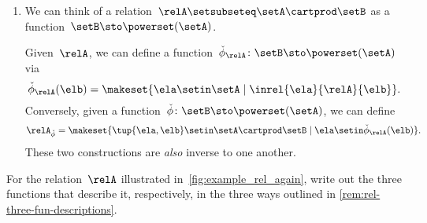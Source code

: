 \begin{enumerate}
    \item We can think of a relation~$\relA \setsubseteq \setA \cartprod \setB$ as a function~$\setB  \sto \powerset (\setA)$.

          Given~$\relA$, we can define a function~$\check \phi_{\relA} \colon \setB \sto \powerset (\setA)$ via
          \begin{equation*}
              \check \phi_{\relA} (\elb) = \makeset{ \ela \setin \setA \mid \inrel{\ela}{\relA}{\elb}}.
          \end{equation*}
          Conversely, given a function~$\check \phi \colon \setB \sto \powerset (\setA)$, we can define
          \begin{equation*}
              \relA_{\check \phi} = \makeset{ \tup{\ela, \elb} \setin \setA \cartprod \setB \mid \ela \setin \check \phi_{\relA}(\elb)}.
          \end{equation*}
          These two constructions are \emph{also} inverse to one another.
\end{enumerate}

\begin{marginfigure}
    \centering
    \caption{}
    \label{fig:example_rel_again}
\end{marginfigure}
\vfill
\begin{gradedexercise}
    \label{ex:Rel3Functions}
    For the relation~$\relA$ illustrated in~\cref{fig:example_rel_again}, write out the three functions that describe it, respectively, in the three ways outlined in \cref{rem:rel-three-fun-descriptions}.
\end{gradedexercise}

